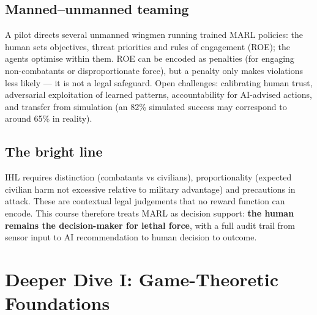 \documentclass[11pt]{article}
\begin{document}
\subsection{Manned--unmanned teaming}
A pilot directs several unmanned wingmen running trained MARL policies: the human sets objectives, threat priorities and rules of engagement (ROE); the agents optimise within them. ROE can be encoded as penalties (for engaging non-combatants or disproportionate force), but a penalty only makes violations less likely --- it is not a legal safeguard. Open challenges: calibrating human trust, adversarial exploitation of learned patterns, accountability for AI-advised actions, and transfer from simulation (an 82\% simulated success may correspond to around 65\% in reality).

\subsection{The bright line}
IHL requires distinction (combatants vs civilians), proportionality (expected civilian harm not excessive relative to military advantage) and precautions in attack. These are contextual legal judgements that no reward function can encode. This course therefore treats MARL as decision support: \textbf{the human remains the decision-maker for lethal force}, with a full audit trail from sensor input to AI recommendation to human decision to outcome.

\section{Deeper Dive I: Game-Theoretic Foundations}
\end{document}
